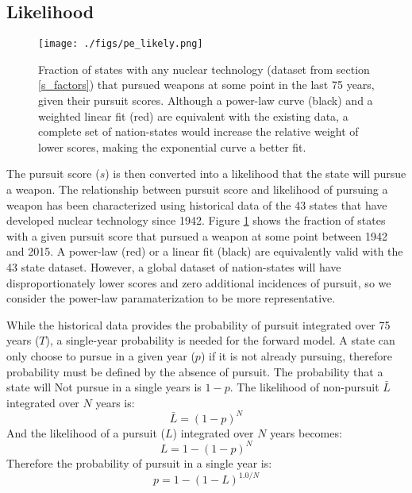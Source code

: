 \subsection{Likelihood}

\begin{figure}%
\texttt{[image: ./figs/pe\_likely.png]}
\caption{Fraction of states with any nuclear technology (dataset from section \ref{s_factors}) that pursued weapons at some point in the last 75 years, given their pursuit scores. Although a power-law curve (black) and a weighted linear fit (red) are equivalent with the existing data, a complete set of nation-states would increase the relative weight of lower scores, making the exponential curve a better fit.}
\label{fig:likely}
\end{figure}
 
The pursuit score ($s$) is then converted into a likelihood that the state will pursue a weapon. The relationship between pursuit score and likelihood of pursuing a weapon has been characterized using historical data of the 43 states that have developed nuclear technology since 1942. Figure \ref{fig:likely} shows the fraction of states with a given pursuit score that pursued a weapon at some point between 1942 and 2015. A power-law (red) or a linear fit (black) are  equivalently valid with the 43 state dataset. However, a global dataset of nation-states will have disproportionately lower scores and zero additional incidences of pursuit, so we consider the power-law paramaterization to be more representative.

While the historical data provides the probability of pursuit integrated over 75 years ($T$), a single-year probability is needed for the forward model. A state can only choose to pursue in a given year ($p$) if it is not already pursuing, therefore probability must be defined by the absence of pursuit. The probability that a state will Not pursue in a single years is $1 - p$. The likelihood of non-pursuit $\bar{L}$ integrated over $N$ years is:
\begin{equation}
\bar{L} = (1- p)^{N}
\end{equation}
And the likelihood of a pursuit ($L$) integrated over $N$ years becomes:
\begin{equation}
L = 1 - (1-p)^{N}
  \end{equation}
Therefore the probability of pursuit in a single year is:
\begin{equation}
p = 1 - (1 - L)^{1.0/N}
\label{eqn:likely_eqn}
\end{equation}

